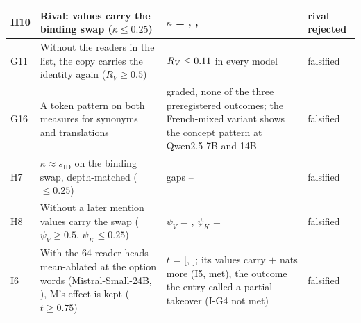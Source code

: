 \begin{table}[p]
\begin{tabular}{@{}l p{} p{} p{}@{}}
H10 & Rival: values carry the binding swap ($\kappa \leq 0.25$) & $\kappa$ = \PkKappaBindNone{}, \PkKappaBindQnames{}, \PkKappaBindOpt{} & rival rejected \\
\midrule
G11 & Without the readers in the list, the copy carries the identity again ($R_V \geq 0.5$) & $R_V \leq 0.11{}$ in every model & falsified \\
G16 & A token pattern on both measures for synonyms and translations & graded, none of the three preregistered outcomes; the French-mixed variant shows the concept pattern at Qwen2.5-7B and 14B & falsified \\
H7 & $\kappa \approx s_{\mathrm{ID}}$ on the binding swap, depth-matched ($\leq 0.25$) & gaps \HsevenGapMin{}--\HsevenGapMax{} & falsified \\
H8 & Without a later mention values carry the swap ($\psi_V \geq 0.5$, $\psi_K \leq 0.25$) & $\psi_V$ = \HeightPsiV{}, $\psi_K$ = \HeightPsiK{} & falsified \\
I6 & With the 64 reader heads mean-ablated at the option words (Mistral-Small-24B, \fmtOpt{}), M's effect is kept ($t \geq 0.75$) & $t$ = \IsixT{} [\IsixTLo{}, \IsixTHi{}]; its values carry $+$\IfiveDV{} nats more (I5, met), the outcome the entry called a partial takeover (I-G4 not met) & falsified \\
\bottomrule
\end{tabular}
\end{table}

